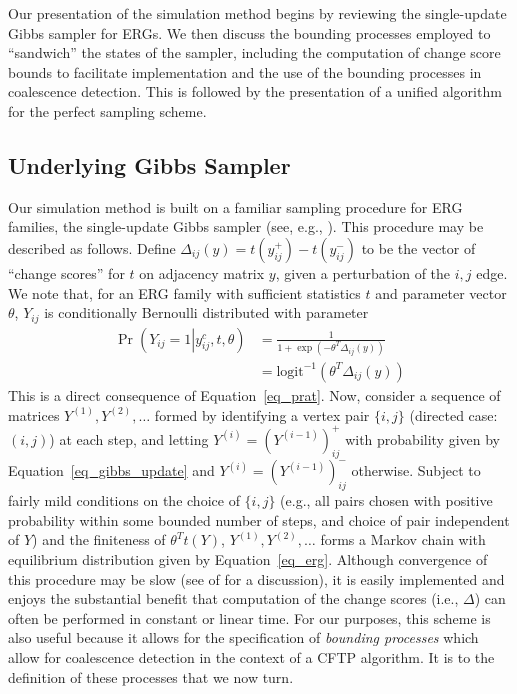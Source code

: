 \documentclass[11pt]{article}
\newcommand{\ilogit}{\ensuremath{\mathrm{logit}^{-1}}\xspace}
\begin{document}
Our presentation of the simulation method begins by reviewing the single-update Gibbs sampler for ERGs.  We then discuss the bounding processes employed to ``sandwich'' the states of the sampler, including the computation of change score bounds to facilitate implementation and the use of the bounding processes in coalescence detection.  This is followed by the presentation of a unified algorithm for the perfect sampling scheme.  

\subsection{Underlying Gibbs Sampler}

Our simulation method is built on a familiar sampling procedure for ERG families, the single-update Gibbs sampler (see, e.g., \citet{snijders:joss:2002}).  This procedure may be described as follows.  Define $\Delta_{ij}(y)=t\left(y^+_{ij}\right)-t\left(y^-_{ij}\right)$ to be the vector of ``change scores'' for $t$ on adjacency matrix $y$, given a perturbation of the $i,j$ edge.  We note that, for an ERG family with sufficient statistics $t$ and parameter vector $\theta$, $Y_{ij}$ is conditionally Bernoulli distributed with parameter
\begin{align}
\Pr\left(Y_{ij}=1 \left| y^c_{ij}, t, \theta\right.\right) &= \frac{1}{1+\exp\left(-\theta^T \Delta_{ij}\left(y\right)\right)}\\  \label{eq_gibbs_update}
&=\ilogit\left(\theta^T \Delta_{ij}\left(y\right)\right)
\end{align}
This is a direct consequence of Equation~\ref{eq_prat}.  Now, consider a sequence of matrices $Y^{(1)},Y^{(2)},\ldots$ formed by identifying a vertex pair $\{i,j\}$ (directed case: $(i,j)$) at each step, and letting $Y^{(i)}=\left(Y^{(i-1)}\right)^+_{ij}$ with probability given by Equation~\ref{eq_gibbs_update} and $Y^{(i)}=\left(Y^{(i-1)}\right)^-_{ij}$ otherwise.  Subject to fairly mild conditions on the choice of $\{i,j\}$ (e.g., all pairs chosen with positive probability within some bounded number of steps, and choice of pair independent of $Y$) and the finiteness of $\theta^T t(Y)$, $Y^{(1)},Y^{(2)},\ldots$ forms a Markov chain with equilibrium distribution given by Equation~\ref{eq_erg}.  Although convergence of this procedure may be slow (see \citet{snijders:joss:2002} of \citet{bhamidi.et.al:aap:2011} for a discussion), it is easily implemented and enjoys the substantial benefit that computation of the change scores (i.e., $\Delta$) can often be performed in constant or linear time.  For our purposes, this scheme is also useful because it allows for the specification of \emph{bounding processes} which allow for coalescence detection in the context of a CFTP algorithm.  It is to the definition of these processes that we now turn.
\end{document}
